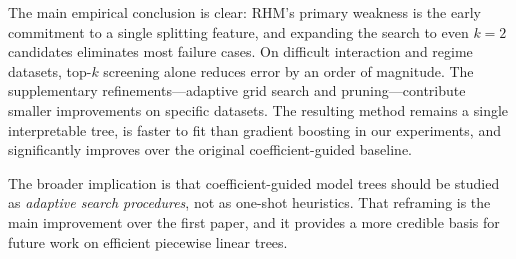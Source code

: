 \documentclass[11pt,a4paper]{article}
\begin{document}
The main empirical conclusion is clear: RHM's primary weakness is the early commitment to a single splitting feature, and expanding the search to even $k\!=\!2$ candidates eliminates most failure cases. On difficult interaction and regime datasets, top-$k$ screening alone reduces error by an order of magnitude. The supplementary refinements---adaptive grid search and pruning---contribute smaller improvements on specific datasets. The resulting method remains a single interpretable tree, is faster to fit than gradient boosting in our experiments, and significantly improves over the original coefficient-guided baseline.

The broader implication is that coefficient-guided model trees should be studied as \emph{adaptive search procedures}, not as one-shot heuristics. That reframing is the main improvement over the first paper, and it provides a more credible basis for future work on efficient piecewise linear trees.


\end{document}
